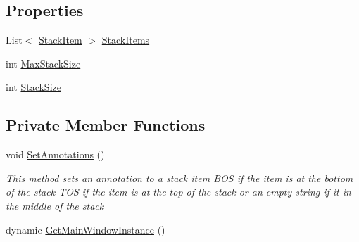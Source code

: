 \subsection*{Properties}
\begin{DoxyCompactItemize}
\item 
List$<$ \hyperlink{class_c_p_u___o_s___simulator_1_1_c_p_u_1_1_stack_item}{Stack\+Item} $>$ \hyperlink{class_c_p_u___o_s___simulator_1_1_c_p_u_1_1_program_stack_a13eb0a485bbcdba8a38bbf80e78692c7}{Stack\+Items}
\item 
int \hyperlink{class_c_p_u___o_s___simulator_1_1_c_p_u_1_1_program_stack_a5ed770e83658cfcde6e451c27342dca3}{Max\+Stack\+Size}
\item 
int \hyperlink{class_c_p_u___o_s___simulator_1_1_c_p_u_1_1_program_stack_ac9cedcbfdf26ffa757042280f21da367}{Stack\+Size}
\end{DoxyCompactItemize}
\subsection*{Private Member Functions}
\begin{DoxyCompactItemize}
\item 
void \hyperlink{class_c_p_u___o_s___simulator_1_1_c_p_u_1_1_program_stack_a64ba20aa2a49863d1197a9aeb31b4a13}{Set\+Annotations} ()
\begin{DoxyCompactList}\small\item\em This method sets an annotation to a stack item B\+O\+S if the item is at the bottom of the stack T\+O\+S if the item is at the top of the stack or an empty string if it in the middle of the stack \end{DoxyCompactList}\item 
dynamic \hyperlink{class_c_p_u___o_s___simulator_1_1_c_p_u_1_1_program_stack_a5e86416fb4e4bdff3605a40f521ea211}{Get\+Main\+Window\+Instance} ()
\end{DoxyCompactItemize}
